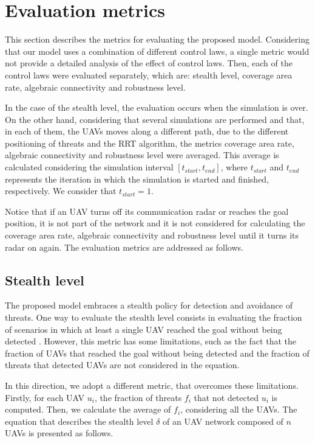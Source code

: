 \section{Evaluation metrics}

This section describes the metrics for evaluating the proposed model. Considering that our model uses a combination of different control laws, a single metric would not provide a detailed analysis of the effect of control laws. Then, each of the control laws were evaluated separately, which are: stealth level, coverage area rate, algebraic connectivity and robustness level.

In the case of the stealth level, the evaluation occurs when the simulation is over. On the other hand, considering that several simulations are performed and that, in each of them, the UAVs moves along a different path, due to the different positioning of threats and the RRT algorithm, the metrics coverage area rate, algebraic connectivity and robustness level were averaged. This average is calculated considering the simulation interval $[t_{start}, t_{end}]$, where $t_{start}$ and $t_{end}$ represents the iteration in which the simulation is started and finished, respectively. We consider that $t_{start}=1$.

Notice that if an UAV turns off its communication radar or reaches the goal position, it is not part of the network and it is not considered for calculating the coverage area rate, algebraic connectivity and robustness level until it turns its radar on again. The evaluation metrics are addressed as follows.

\subsection{Stealth level}

The proposed model embraces a stealth policy for detection and avoidance of threats. One way to evaluate the stealth level consists in evaluating the fraction of scenarios in which at least a single UAV reached the goal without being detected \cite{borges_2017}. However, this metric has some limitations, such as the fact that the fraction of UAVs that reached the goal without being detected and the fraction of threats that detected UAVs are not considered in the equation.

In this direction, we adopt a different metric, that overcomes these limitations. Firstly, for each UAV $u_i$, the fraction of threats $f_i$ that not detected $u_i$ is computed. Then, we calculate the average of $f_i$, considering all the UAVs. The equation that describes the stealth level $\delta$ of an UAV network composed of $n$ UAVs is presented as follows.

